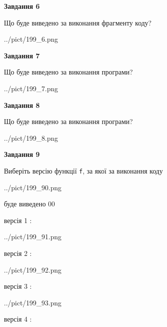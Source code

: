 \documentclass[12pt, ukrainian]{article}
\def\code#1{\Verb!#1!}
\begin{document}
{\begin {large}
{\begin {center}\textbf{Завдання 6}\end {center}}

Що буде виведено за виконання фрагменту коду?\par
\begin{center}
	{../pict/199_6.png}
\end{center}
\newpage

{\begin {center}\textbf{Завдання 7}\end {center}}

Що буде виведено за виконання програми?\par
\begin{center}
	{../pict/199_7.png}
\end{center}
\newpage

{\begin {center}\textbf{Завдання 8}\end {center}}

Що буде виведено за виконання програми?\par
\begin{center}
	{../pict/199_8.png}
\end{center}
\newpage

{\begin {center}\textbf{Завдання 9}\end {center}}

Виберіть версію функції \code{f}, за якої за виконання коду
\begin{center}
	{../pict/199_90.png}
\end{center}
буде виведено 00

\vspace{5mm}
версія 1 :

\begin{center}
	{../pict/199_91.png}
\end{center}
версія 2 :

\begin{center}
	{../pict/199_92.png}
\end{center}
версія 3 :

\begin{center}
	{../pict/199_93.png}
\end{center}
версія 4 :


\end{large}}
\end{document}
